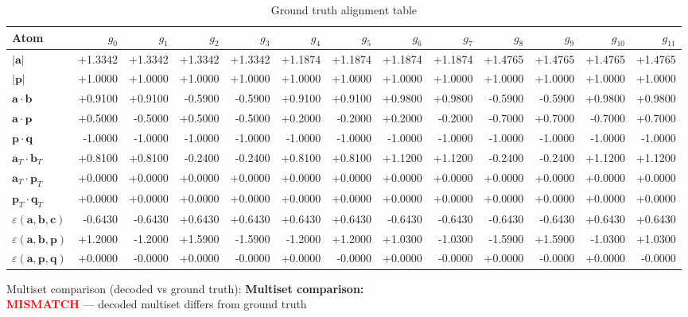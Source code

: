 \documentclass[a4paper,11pt]{article}
\newcommand{\vc}[1]{\ensuremath{\mathbf{#1}}}
\newcommand{\dnfagmiihhiejm}[1]{|\vc{#1}|}
\newcommand{\pdcegfomjfhook}[2]{\mathbf{#1} \cdot \mathbf{#2}}
\newcommand{\fpbeomcfokjooi}[2]{\mathbf{#1}_T \cdot \mathbf{#2}_T}
\newcommand{\kblbmcpggoncpf}[3]{\varepsilon(\mathbf{#1},\mathbf{#2},\mathbf{#3})}
\begin{document}
\begin{table}[h]\centering
\caption{Ground truth alignment table}
\begin{tabular}{lrrrrrrrrrrrr}
\toprule
Atom & $g_{0}$ & $g_{1}$ & $g_{2}$ & $g_{3}$ & $g_{4}$ & $g_{5}$ & $g_{6}$ & $g_{7}$ & $g_{8}$ & $g_{9}$ & $g_{10}$ & $g_{11}$ \\
\midrule
$\dnfagmiihhiejm{a}$ & +1.3342 & +1.3342 & +1.3342 & +1.3342 & +1.1874 & +1.1874 & +1.1874 & +1.1874 & +1.4765 & +1.4765 & +1.4765 & +1.4765 \\
$\dnfagmiihhiejm{p}$ & +1.0000 & +1.0000 & +1.0000 & +1.0000 & +1.0000 & +1.0000 & +1.0000 & +1.0000 & +1.0000 & +1.0000 & +1.0000 & +1.0000 \\
$\pdcegfomjfhook{a}{b}$ & +0.9100 & +0.9100 & -0.5900 & -0.5900 & +0.9100 & +0.9100 & +0.9800 & +0.9800 & -0.5900 & -0.5900 & +0.9800 & +0.9800 \\
$\pdcegfomjfhook{a}{p}$ & +0.5000 & -0.5000 & +0.5000 & -0.5000 & +0.2000 & -0.2000 & +0.2000 & -0.2000 & -0.7000 & +0.7000 & -0.7000 & +0.7000 \\
$\pdcegfomjfhook{p}{q}$ & -1.0000 & -1.0000 & -1.0000 & -1.0000 & -1.0000 & -1.0000 & -1.0000 & -1.0000 & -1.0000 & -1.0000 & -1.0000 & -1.0000 \\
$\fpbeomcfokjooi{a}{b}$ & +0.8100 & +0.8100 & -0.2400 & -0.2400 & +0.8100 & +0.8100 & +1.1200 & +1.1200 & -0.2400 & -0.2400 & +1.1200 & +1.1200 \\
$\fpbeomcfokjooi{a}{p}$ & +0.0000 & +0.0000 & +0.0000 & +0.0000 & +0.0000 & +0.0000 & +0.0000 & +0.0000 & +0.0000 & +0.0000 & +0.0000 & +0.0000 \\
$\fpbeomcfokjooi{p}{q}$ & +0.0000 & +0.0000 & +0.0000 & +0.0000 & +0.0000 & +0.0000 & +0.0000 & +0.0000 & +0.0000 & +0.0000 & +0.0000 & +0.0000 \\
$\kblbmcpggoncpf{a}{b}{c}$ & -0.6430 & -0.6430 & +0.6430 & +0.6430 & +0.6430 & +0.6430 & -0.6430 & -0.6430 & -0.6430 & -0.6430 & +0.6430 & +0.6430 \\
$\kblbmcpggoncpf{a}{b}{p}$ & +1.2000 & -1.2000 & +1.5900 & -1.5900 & -1.2000 & +1.2000 & +1.0300 & -1.0300 & -1.5900 & +1.5900 & -1.0300 & +1.0300 \\
$\kblbmcpggoncpf{a}{p}{q}$ & +0.0000 & -0.0000 & +0.0000 & -0.0000 & +0.0000 & -0.0000 & +0.0000 & -0.0000 & +0.0000 & -0.0000 & +0.0000 & -0.0000 \\
\bottomrule\end{tabular}\end{table}

  Multiset comparison  (decoded vs ground truth):
\textbf{Multiset comparison:}\\
\textcolor{red}{\textbf{MISMATCH}} — decoded multiset differs from ground truth
\end{document}
